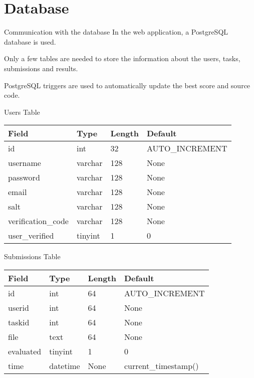 \documentclass{beamer}
\begin{document}
	\begin{frame}[fragile]
		\tiny
		\inputminted{python}{examples/4/app.py}
	\end{frame}

	\section{Database}

	\begin{frame}{Communication with the database}
		In the web application, a PostgreSQL database is used. \par

		Only a few tables are needed to store the information about the users, tasks, submissions and results. \par

		PostgreSQL triggers are used to automatically update the best score and source code. 
	\end{frame}

	\begin{frame}{Users Table}
		\centering
		\begin{tabular}{|l|l|l|l|}
		\hline
		Field & Type & Length & Default \\
		\hline
		id & int & 32 & AUTO\_INCREMENT \\
		username & varchar & 128 & None \\
		password & varchar & 128 & None \\
		email & varchar & 128 & None \\
		salt & varchar & 128 & None \\
		verification\_code & varchar & 128 & None \\
		user\_verified & tinyint & 1 & 0 \\
		\hline
		\end{tabular}
		\end{frame}

		\begin{frame}{Submissions Table}
			\centering
			\begin{tabular}{|l|l|l|l|}
			\hline
			Field & Type & Length & Default \\
			\hline
			id & int & 64 & AUTO\_INCREMENT \\
			userid & int & 64 & None \\
			taskid & int & 64 & None \\
			file & text & 64 & None \\
			evaluated & tinyint & 1 & 0 \\
			time & datetime & None & current\_timestamp() \\
			\hline
			\end{tabular}
		\end{frame}
\end{document}
